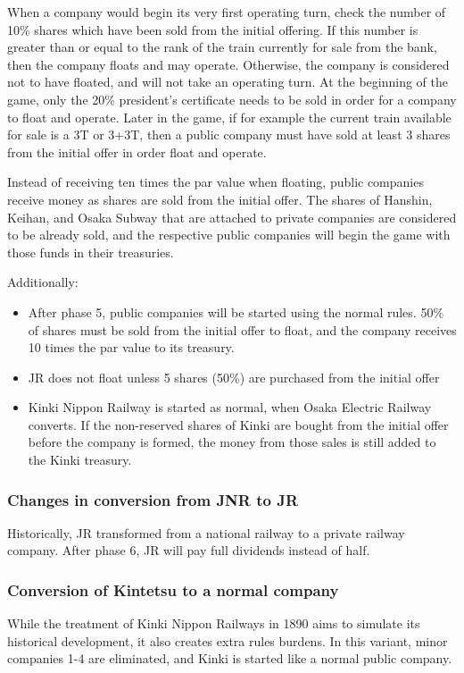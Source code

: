 \documentclass{article}
\begin{document}
\begin{CJK}{UTF8}{min}
\begin{multicols}{2}
When a company would begin its very first operating turn, check the
number of 10\% shares which have been sold from the initial
offering. If this number is greater than or equal to the rank of the
train currently for sale from the bank, then the company floats and
may operate. Otherwise, the company is considered not to have floated,
and will not take an operating turn. At the beginning of the game,
only the 20\% president's certificate needs to be sold in order for a
company to float and operate. Later in the game, if for example the
current train available for sale is a 3T or 3+3T, then a public
company must have sold at least 3 shares from the initial offer in
order float and operate.

Instead of receiving ten times the par value when floating, public
companies receive money as shares are sold from the initial offer. The
shares of Hanshin, Keihan, and Osaka Subway that are attached to
private companies are considered to be already sold, and the
respective public companies will begin the game with those funds in
their treasuries.

Additionally:
\begin{itemize}

\item After phase 5, public companies will be started using the normal
  rules. 50\% of shares must be sold from the initial offer to float,
  and the company receives 10 times the par value to its treasury.

\item JR does not float unless 5 shares (50\%) are purchased
  from the initial offer

\item Kinki Nippon Railway is started as normal, when Osaka Electric
  Railway converts. If the non-reserved shares of Kinki are bought
  from the initial offer before the company is formed, the money from
  those sales is still added to the Kinki treasury.

\end{itemize}

\subsubsection{Changes in conversion from JNR to JR}

Historically, JR transformed from a national railway to a private
railway company. After phase 6, JR will pay full dividends instead of
half.

\subsubsection{Conversion of Kintetsu to a normal company}
While the treatment of Kinki Nippon Railways in 1890 aims to simulate
its historical development, it also creates extra rules burdens. In
this variant, minor companies 1-4 are eliminated, and Kinki is started
like a normal public company.


\end{multicols}
\end{CJK}
\end{document}
